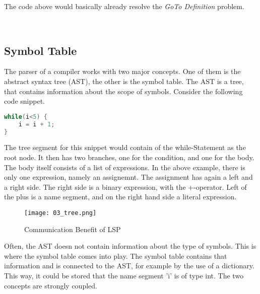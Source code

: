 The code above would basically already resolve the \textit{GoTo Definition} problem.



\\


\subsection{Symbol Table}
The parser of a compiler works with two major concepts. One of them is the abstract syntax tree (AST), the other is the symbol table. The AST is a tree, that contains information about the scope of symbols. Consider the following code snippet.

\begin{lstlisting}[language=csharp, caption={AST Demo Snippet}, captionpos=b, label={lst:astsnipped}]
while(i<5) {
    i = i + 1;
}
\end{lstlisting}

The tree segment for this snippet would contain of the while-Statement as the root node. It then has two branches, one for the condition, and one for the body. The body itself consists of a list of expressions. In the above example, there is only one expression, namely an assignemnt. The assignment has again a left and a right side. The right side is a binary expression, with the +-operator. Left of the plus is a name segment, and on the right hand side a literal expression.\\

\begin{figure}[h]
    \centering
    \texttt{[image: 03\_tree.png]}
    \caption{Communication Benefit of LSP}
    \label{fig:tree_for_example}
\end{figure}

Often, the AST doesn not contain information about the type of symbols. This is where the symbol table comes into play. The symbol table contains that information and is connected to the AST, for example by the use of a dictionary. This way, it could be stored that the name segment 'i' is of type int. The two concepts are strongly coupled.

